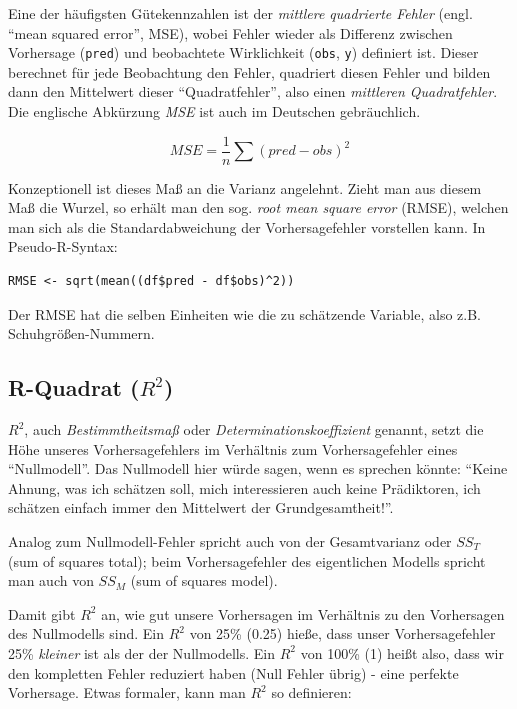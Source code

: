 \documentclass[12pt,ngerman,]{book}
\theoremstyle{definition}
\theoremstyle{definition}
\theoremstyle{remark}
\begin{document}
Eine der häufigsten Gütekennzahlen ist der \emph{mittlere quadrierte
Fehler} (engl. ``mean squared error'', MSE), wobei Fehler wieder als
Differenz zwischen Vorhersage (\texttt{pred}) und beobachtete
Wirklichkeit (\texttt{obs}, \texttt{y}) definiert ist. Dieser berechnet
für jede Beobachtung den Fehler, quadriert diesen Fehler und bilden dann
den Mittelwert dieser ``Quadratfehler'', also einen \emph{mittleren
Quadratfehler}. Die englische Abkürzung \emph{MSE} ist auch im Deutschen
gebräuchlich.

\[ MSE = \frac{1}{n} \sum{(pred - obs)^2} \]

Konzeptionell ist dieses Maß an die Varianz angelehnt. Zieht man aus
diesem Maß die Wurzel, so erhält man den sog. \emph{root mean square
error} (RMSE), welchen man sich als die Standardabweichung der
Vorhersagefehler vorstellen kann. In Pseudo-R-Syntax:

\begin{verbatim}
RMSE <- sqrt(mean((df$pred - df$obs)^2))
\end{verbatim}

Der RMSE hat die selben Einheiten wie die zu schätzende Variable, also
z.B. Schuhgrößen-Nummern.

\subsection{\texorpdfstring{R-Quadrat
(\(R^2\))}{R-Quadrat (R\^{}2)}}\label{r-quadrat-r2}

\(R^2\), auch \emph{Bestimmtheitsmaß} oder
\emph{Determinationskoeffizient}
genannt, setzt die Höhe unseres
Vorhersagefehlers im Verhältnis zum
Vorhersagefehler eines ``Nullmodell''. Das Nullmodell hier würde sagen,
wenn es sprechen könnte: ``Keine Ahnung, was ich schätzen soll, mich
interessieren auch keine Prädiktoren, ich schätzen einfach immer den
Mittelwert der Grundgesamtheit!''.

Analog zum Nullmodell-Fehler spricht auch von der Gesamtvarianz oder
\(SS_T\) (sum of squares total); beim Vorhersagefehler des eigentlichen
Modells spricht man auch von \(SS_M\) (sum of squares model).

Damit gibt \(R^2\) an, wie gut unsere Vorhersagen im Verhältnis zu den
Vorhersagen des Nullmodells sind. Ein \(R^2\) von 25\% (0.25) hieße,
dass unser Vorhersagefehler 25\% \emph{kleiner} ist als der der
Nullmodells. Ein \(R^2\) von 100\% (1) heißt also, dass wir den
kompletten Fehler reduziert haben (Null Fehler übrig) - eine perfekte
Vorhersage. Etwas formaler, kann man \(R^2\) so definieren:
\end{document}
